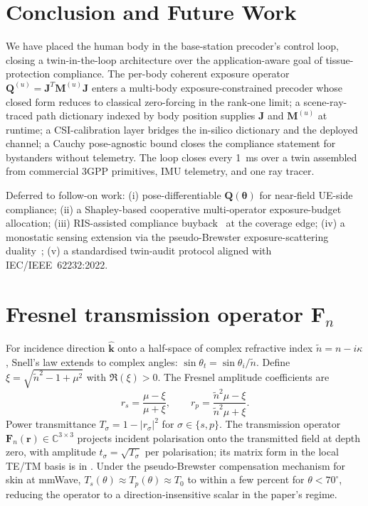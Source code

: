 \documentclass[journal,twocolumn,10pt]{IEEEtran}
\theoremstyle{definition}
\newcommand{\khat}{\hat{\bm{k}}}
\newcommand{\rr}{\mathbf{r}}
\newcommand{\Q}{\mathbf{Q}}
\newcommand{\Jmat}{\mathbf{J}}
\newcommand{\Mmat}{\mathbf{M}}
\newcommand{\Complex}{\mathbb{C}}
\begin{document}
\section{Conclusion and Future Work}\label{sec:conclusion}

We have placed the human body in the base-station precoder's
control loop, closing a twin-in-the-loop architecture over the
application-aware goal of tissue-protection compliance. The
per-body coherent exposure operator
$\Q^{(u)}=\Jmat^T\Mmat^{(u)}\Jmat$ enters a multi-body
exposure-constrained precoder whose closed form reduces to
classical zero-forcing in the rank-one limit; a scene-ray-traced
path dictionary indexed by body position supplies $\Jmat$ and
$\Mmat^{(u)}$ at runtime; a CSI-calibration layer bridges the
in-silico dictionary and the deployed channel; a Cauchy
pose-agnostic bound closes the compliance statement for
bystanders without telemetry. The loop closes every 1~ms over a
twin assembled from commercial 3GPP primitives, IMU telemetry,
and one ray tracer.

Deferred to follow-on work: (i) pose-differentiable
$\Q(\bm\theta)$ for near-field UE-side compliance; (ii) a
Shapley-based cooperative multi-operator exposure-budget
allocation; (iii) RIS-assisted compliance
buyback~\cite{RIS-EMF2022} at the coverage edge; (iv)
a monostatic sensing extension via the pseudo-Brewster
exposure-scattering duality~\cite{QComplement}; (v) a
standardised twin-audit protocol aligned with
IEC/IEEE~62232:2022.

\appendices

\section{Fresnel transmission operator $\mathbf{F}_n$}\label{app:fresnel}

For incidence direction $\khat$ onto a half-space of complex
refractive index $\tilde n=n-i\kappa$, Snell's law extends to
complex angles: $\sin\theta_t=\sin\theta_i/\tilde n$. Define
$\xi=\sqrt{\tilde n^2-1+\mu^2}$ with $\Re(\xi)>0$. The Fresnel
amplitude coefficients are
\begin{equation}
  r_s=\frac{\mu-\xi}{\mu+\xi},\qquad
  r_p=\frac{\tilde n^2\mu-\xi}{\tilde n^2\mu+\xi}.
\end{equation}
Power transmittance $T_\sigma=1-|r_\sigma|^2$ for $\sigma\in\{s,p\}$.
The transmission operator $\mathbf{F}_n(\rr)\in\Complex^{3\times 3}$
projects incident polarisation onto the transmitted field at
depth zero, with amplitude $t_\sigma=\sqrt{T_\sigma}$ per
polarisation; its matrix form in the local TE/TM basis is in
\cite[App.~B]{WydaegheMonograph}. Under the
pseudo-Brewster compensation mechanism for skin at mmWave,
$T_s(\theta)\approx T_p(\theta)\approx T_0$ to within a few
percent for $\theta<70^{\circ}$, reducing the operator to a
direction-insensitive scalar in the paper's regime.
\end{document}
